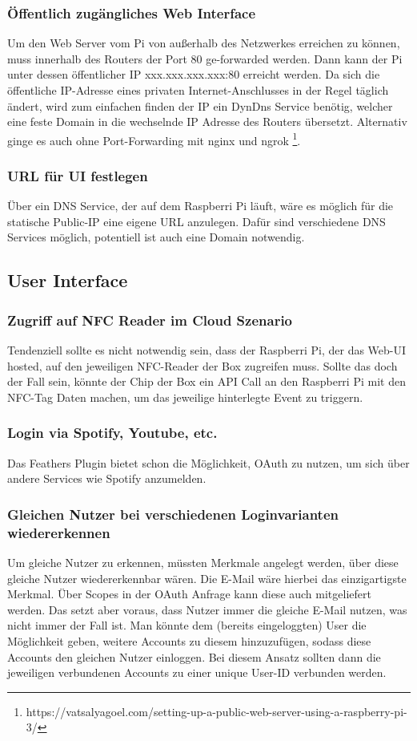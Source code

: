 \documentclass[10pt, a4paper, draft]{article}
\begin{document}
\subsubsection{Öffentlich zugängliches Web Interface}
Um den Web Server vom Pi von außerhalb des Netzwerkes erreichen zu können, muss innerhalb des Routers der Port 80 ge-forwarded werden.
Dann kann der Pi unter dessen öffentlicher IP xxx.xxx.xxx.xxx:80 erreicht werden.
Da sich die öffentliche IP-Adresse eines privaten Internet-Anschlusses in der Regel täglich ändert, wird zum einfachen finden der IP ein DynDns Service benötig, welcher eine feste Domain in die wechselnde IP Adresse des Routers übersetzt.
Alternativ ginge es auch ohne Port-Forwarding mit nginx und ngrok \footnote{https://vatsalyagoel.com/setting-up-a-public-web-server-using-a-raspberry-pi-3/}.

\subsubsection{URL für UI festlegen}
Über ein DNS Service, der auf dem Raspberri Pi läuft, wäre es möglich für die statische Public-IP eine eigene URL anzulegen.
Dafür sind verschiedene DNS Services möglich, potentiell ist auch eine Domain notwendig.

\subsection{User Interface}
\subsubsection{Zugriff auf NFC Reader im Cloud Szenario}
Tendenziell sollte es nicht notwendig sein, dass der Raspberri Pi, der das Web-UI hosted, auf den jeweiligen NFC-Reader der Box zugreifen muss.
Sollte das doch der Fall sein, könnte der Chip der Box ein API Call an den Raspberri Pi mit den NFC-Tag Daten machen, um das jeweilige hinterlegte Event zu triggern.

\subsubsection{Login via Spotify, Youtube, etc.}
Das Feathers Plugin bietet schon die Möglichkeit, OAuth zu nutzen, um sich über andere Services wie Spotify anzumelden.

\subsubsection{Gleichen Nutzer bei verschiedenen Loginvarianten wiedererkennen}
Um gleiche Nutzer zu erkennen, müssten Merkmale angelegt werden, über diese gleiche Nutzer wiedererkennbar wären.
Die E-Mail wäre hierbei das einzigartigste Merkmal. Über Scopes in der OAuth Anfrage kann diese auch mitgeliefert werden.
Das setzt aber voraus, dass Nutzer immer die gleiche E-Mail nutzen, was nicht immer der Fall ist.
Man könnte dem (bereits eingeloggten) User die Möglichkeit geben, weitere Accounts zu diesem hinzuzufügen, sodass diese Accounts den gleichen Nutzer einloggen.
Bei diesem Ansatz sollten dann die jeweiligen verbundenen Accounts zu einer unique User-ID verbunden werden.
\end{document}
